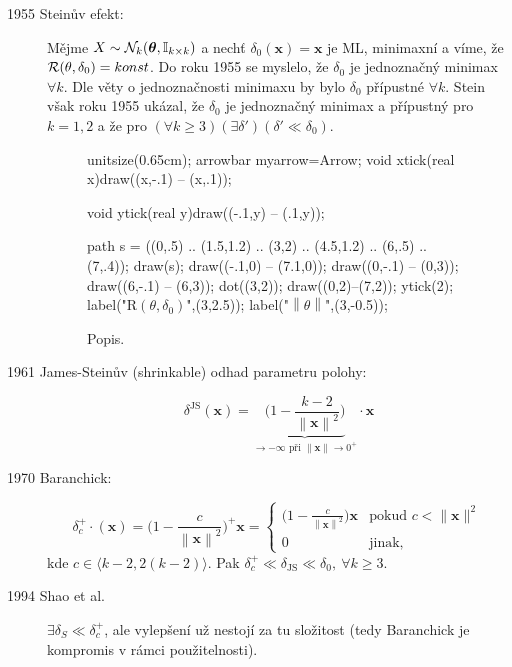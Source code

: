 \begin{description}
	\item[1955 Steinův efekt:] Mějme $X\sim \mathcal{N}_k(\boldsymbol{\theta},\mathbb{I}_{k\times k})$ a nechť $\delta_0(\textbf{x})=\textbf{x}$ je ML, minimaxní a víme, že $\mathcal{R}(\theta,\delta_0)=konst$. Do roku 1955 se myslelo, že $\delta_0$ je jednoznačný minimax $\forall k$. Dle věty o jednoznačnosti minimaxu by bylo $\delta_0$  přípustné $\forall k$. Stein však roku 1955 ukázal, že $\delta_0$ je jednoznačný minimax a přípustný pro $k=1,2$ a že pro $(\forall k\geq3)(\exists\delta')(\delta'\ll\delta_0)$.
	  \begin{figure}[h]
		\centering
		\begin{asy}
		unitsize(0.65cm);
		arrowbar myarrow=Arrow;
		void xtick(real x){draw((x,-.1) -- (x,.1));}
		
		void ytick(real y){draw((-.1,y) -- (.1,y));}
		
		path s = ((0,.5) .. (1.5,1.2) .. (3,2) .. (4.5,1.2) .. (6,.5) .. (7,.4));
		draw(s);
		draw((-.1,0) -- (7.1,0));
		draw((0,-.1) -- (0,3));
		draw((6,-.1) -- (6,3));
		dot((3,2));
		draw((0,2)--(7,2));
		ytick(2);
		label("$\mathrm{R}(\theta,\delta_0)$",(3,2.5));
		label("$\left\|\theta\right\|$",(3,-0.5));
		\end{asy}
		\caption{Popis.}\label{pic2}
	\end{figure}
	\FloatBarrier
	\item[1961 James-Steinův (shrinkable) odhad parametru polohy:]$$ \delta^\mathrm{JS}(\textbf{x})=\underbrace{\Big(1-\frac{k-2}{\left\|\textbf{x}\right\|^2}\Big)}_{\to-\infty\text{ při }\left\|\textbf{x}\right\|\to0^+}\cdot\textbf{x} $$
	\item[1970 Baranchick:] $$ \delta_c^+\cdot(\textbf{x})=\Big(1-\frac{c}{\left\|\textbf{x}\right\|^2}\Big)^+\textbf{x}=\begin{cases}
	\big(1-\frac{c}{\left\|\textbf{x}\right\|^2}\big)\textbf{x} & \text{pokud }c<\|\textbf{x}\|^2 \\0 & \text{jinak,}
	\end{cases} $$
	kde $c\in\langle k-2,2(k-2)\rangle$. Pak $\delta_c^+\ll \delta_\mathrm{JS} \ll \delta_0,~\forall k\geq 3$.
	\item[1994 Shao et al.] $\exists \delta_S \ll \delta_c^+$, ale vylepšení už nestojí za tu složitost (tedy Baranchick je kompromis v rámci použitelnosti).
\end{description}

